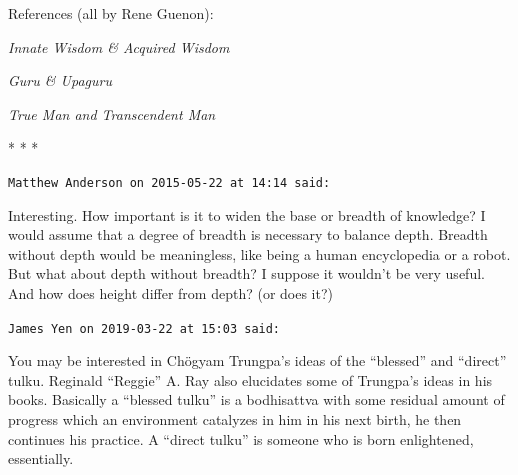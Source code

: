 References (all by Rene Guenon):

\textit{Innate Wisdom \& Acquired Wisdom}

\textit{Guru \& Upaguru}

\textit{True Man and Transcendent Man}



\begin{center}* * *\end{center}

\begin{footnotesize}
\begin{sffamily}

\texttt{Matthew Anderson on 2015-05-22 at 14:14 said:}

Interesting. How important is it to widen the base or breadth of knowledge? I would assume that a degree of breadth is necessary to balance depth. Breadth without depth would be meaningless, like being a human encyclopedia or a robot. But what about depth without breadth? I suppose it wouldn't be very useful. And how does height differ from depth? (or does it?)

\hfill

\texttt{James Yen on 2019-03-22 at 15:03 said:}

You may be interested in Chögyam Trungpa's ideas of the ``blessed'' and ``direct'' tulku. Reginald ``Reggie'' A. Ray also elucidates some of Trungpa's ideas in his books. Basically a ``blessed tulku'' is a bodhisattva with some residual amount of progress which an environment catalyzes in him in his next birth, he then continues his practice. A ``direct tulku'' is someone who is born enlightened, essentially.


\hfill

\end{sffamily}
\end{footnotesize}

